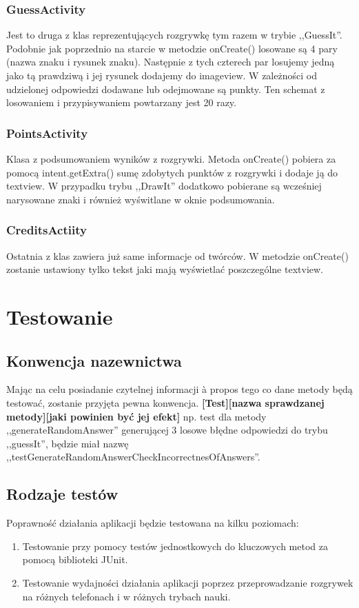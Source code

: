 \documentclass[15pt]{article}
\begin{document}
  \subsubsection{GuessActivity}
  Jest to druga z klas reprezentujących rozgrywkę tym razem w trybie ,,GuessIt''. Podobnie jak poprzednio na starcie w metodzie onCreate() losowane są 4 pary (nazwa znaku i rysunek znaku). Następnie z tych czterech par losujemy jedną jako tą prawdziwą i jej rysunek dodajemy do imageview. W zależności od udzielonej odpowiedzi dodawane lub odejmowane są punkty. Ten schemat z losowaniem i przypisywaniem powtarzany jest 20 razy.
  
  \newpage
  \subsubsection{PointsActivity}
  Klasa z podsumowaniem wyników z rozgrywki. Metoda onCreate() pobiera za pomocą intent.getExtra() sumę zdobytych punktów z rozgrywki i dodaje ją do textview. W przypadku trybu ,,DrawIt'' dodatkowo pobierane są wcześniej narysowane znaki i również wyświtlane w oknie podsumowania. 
  
  \subsubsection{CreditsActiity}
  Ostatnia z klas zawiera już same informacje od twórców. W metodzie onCreate() zostanie ustawiony tylko tekst jaki mają wyświetlać poszczególne textview. 
  
  \section{Testowanie}
  \subsection{Konwencja nazewnictwa}
  Mając na celu posiadanie czytelnej informacji à propos tego co dane metody będą testować, zostanie przyjęta pewna konwencja.
  \newline
  \newline
  \textbf{[Test][nazwa sprawdzanej metody][jaki powinien być jej efekt]}
  \newline
  \newline
  np. test dla metody ,,generateRandomAnswer'' generującej 3 losowe błędne odpowiedzi do trybu ,,guessIt'', będzie miał nazwę ,,testGenerateRandomAnswerCheckIncorrectnesOfAnswers''.
  \subsection{Rodzaje testów}
  Poprawność działania aplikacji będzie testowana na kilku poziomach:
  \begin{enumerate}
    \item Testowanie przy pomocy testów jednostkowych do kluczowych metod za pomocą biblioteki JUnit.
    \item Testowanie wydajności działania aplikacji poprzez przeprowadzanie rozgrywek na różnych telefonach i w różnych trybach nauki.
  \end{enumerate}
  
  
\end{document}
